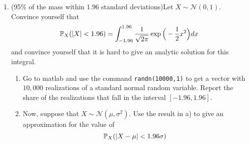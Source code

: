 \documentclass[11pt]{article} %
\begin{document}
\begin{enumerate}
\begin{enumerate}
\end{enumerate}

\item (95\% of the mass within 1.96 standard deviations)Let $X \sim \mathcal{N}(0,1)$. Convince yourself that 
$$\mathbb{P}_{X}(|X|<1.96) = \int_{-1.96}^{1.96} \frac{1}{\sqrt{2\pi}} \exp\Big( -\frac{1}{2}x^2 \Big)dx $$
\noindent and convince yourself that it is hard to give an analytic solution for this integral. 
\begin{enumerate}[a]
\item Go to matlab and use the command \texttt{randn(10000,1)} to get a vector with $10,000$ realizations of a standard normal random variable.   Report the share of the realizations that fall in the interval $[-1.96,1.96]$. 
\item Now, suppose that $X \sim \mathcal{N}(\mu,\sigma^2)$. Use the result in a) to give an approximation for the value of 
$$ \mathbb{P}_{X}(|X-\mu|< 1.96 \sigma) $$ 
\end{enumerate}

\end{enumerate}

\newpage



\end{document}
